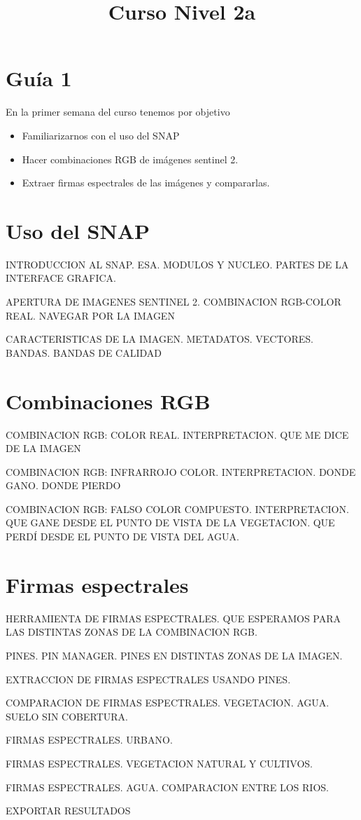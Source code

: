 \documentclass[a4paper]{article}
\title{Curso Nivel 2a}
\begin{document}
\section{Guía 1}
En la primer semana del curso tenemos por objetivo
\begin{itemize}
    \item Familiarizarnos con el uso del SNAP
    \item Hacer combinaciones RGB de imágenes sentinel 2.
    \item Extraer firmas espectrales de las imágenes y compararlas.
\end{itemize}

\section{Uso del SNAP}

INTRODUCCION AL SNAP. ESA. MODULOS Y NUCLEO. PARTES DE LA INTERFACE GRAFICA.

APERTURA DE IMAGENES SENTINEL 2. COMBINACION RGB-COLOR REAL. NAVEGAR POR LA IMAGEN

CARACTERISTICAS DE LA IMAGEN. METADATOS. VECTORES. BANDAS. BANDAS DE CALIDAD

\section{Combinaciones RGB}

COMBINACION RGB: COLOR REAL. INTERPRETACION. QUE ME DICE DE LA IMAGEN

COMBINACION RGB: INFRARROJO COLOR. INTERPRETACION. DONDE GANO. DONDE PIERDO

COMBINACION RGB: FALSO COLOR COMPUESTO. INTERPRETACION. QUE GANE DESDE EL PUNTO DE VISTA DE LA VEGETACION. QUE PERDÍ DESDE EL PUNTO DE VISTA DEL AGUA.

\section{Firmas espectrales}

HERRAMIENTA DE FIRMAS ESPECTRALES. QUE ESPERAMOS PARA LAS DISTINTAS ZONAS DE LA COMBINACION RGB.

PINES. PIN MANAGER. PINES EN DISTINTAS ZONAS DE LA IMAGEN.

EXTRACCION DE FIRMAS ESPECTRALES USANDO PINES.

COMPARACION DE FIRMAS ESPECTRALES. VEGETACION. AGUA. SUELO SIN COBERTURA.

FIRMAS ESPECTRALES. URBANO.

FIRMAS ESPECTRALES. VEGETACION NATURAL Y CULTIVOS.

FIRMAS ESPECTRALES. AGUA. COMPARACION ENTRE LOS RIOS.

EXPORTAR RESULTADOS
\end{document}
